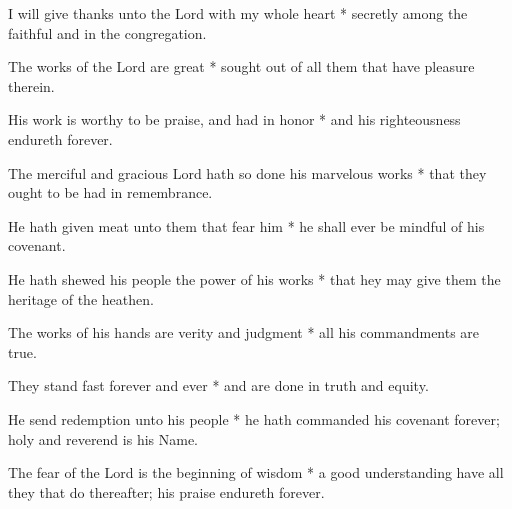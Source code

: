 I will give thanks unto the Lord with my whole heart * secretly among the faithful and in the congregation.

The works of the Lord are great * sought out of all them that have pleasure therein.
	
His work is worthy to be praise, and had in honor * and his righteousness endureth forever.
	
The merciful and gracious Lord hath so done his marvelous works * that they ought to be had in remembrance.
	
He hath given meat unto them that fear him * he shall ever be mindful of his covenant.
	
He hath shewed his people the power of his works * that hey may give them the heritage of the heathen.
	
The works of his hands are verity and judgment * all his commandments are true.
	
They stand fast forever and ever * and are done in truth and equity.
	
He send redemption unto his people * he hath commanded his covenant forever; holy and reverend is his Name.
	
The fear of the Lord is the beginning of wisdom * a good understanding have all they that do thereafter; his praise endureth forever.